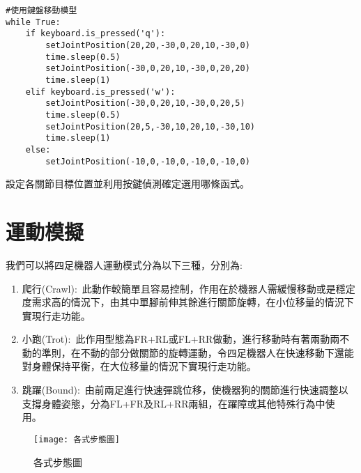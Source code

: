 \label{鍵盤控制及角度設定}
\begin{lstlisting}[caption=\Large 鍵盤控制及角度設定]
#使用鍵盤移動模型
while True:
    if keyboard.is_pressed('q'):
        setJointPosition(20,20,-30,0,20,10,-30,0)
        time.sleep(0.5)
        setJointPosition(-30,0,20,10,-30,0,20,20)
        time.sleep(1)
    elif keyboard.is_pressed('w'):
        setJointPosition(-30,0,20,10,-30,0,20,5)
        time.sleep(0.5)
        setJointPosition(20,5,-30,10,20,10,-30,10)
        time.sleep(1)
    else:
        setJointPosition(-10,0,-10,0,-10,0,-10,0)
\end{lstlisting}
設定各關節目標位置並利用按鍵偵測確定選用哪條函式。\

\section{運動模擬}
我們可以將四足機器人運動模式分為以下三種，分別為:\
\begin{enumerate}
\item 爬行(Crawl):\
此動作較簡單且容易控制，作用在於機器人需緩慢移動或是穩定度需求高的情況下，由其中單腳前伸其餘進行關節旋轉，在小位移量的情況下實現行走功能。\
\item 小跑(Trot):\
此作用型態為FR+RL或FL+RR做動，進行移動時有著兩動兩不動的準則，在不動的部分做關節的旋轉運動，令四足機器人在快速移動下還能對身體保持平衡，在大位移量的情況下實現行走功能。\
\item 跳躍(Bound):\
由前兩足進行快速彈跳位移，使機器狗的關節進行快速調整以支撐身體姿態，分為FL+FR及RL+RR兩組，在躍障或其他特殊行為中使用。\
\end{enumerate}
\begin{figure}[hbt!]
\center
\texttt{[image: 各式步態圖]}
\caption{\Large 各式步態圖}\label{各式步態圖}
\end{figure}

\newpage
